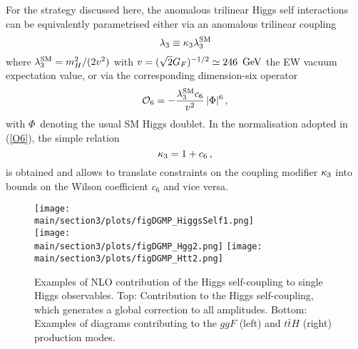 For the strategy discussed here, the anomalous trilinear Higgs self interactions can be equivalently parametrised either via an anomalous trilinear coupling  
\begin{equation}
\lambda_{3} \equiv \kappa_{3} \lambda_{3}^{\rm SM}
\end{equation}
where $\lambda_3^{\rm SM} = m_H^2/(2 v^2)$ with $v = (\sqrt{2} G_F)^{-1/2} \simeq 246 \, {\rm ~\text{GeV}}$ the EW vacuum expectation value, or via the corresponding dimension-six operator 
\begin{equation} \label{O6}
{\cal O}_6 = - \frac{\lambda_3^{\rm SM} c_6}{v^2} \, |\Phi|^6  \,,
\end{equation}
with $\Phi$~denoting the usual SM Higgs doublet. In the normalisation adopted in (\ref{O6}), the simple relation 
\begin{equation}
\kappa_{3} = 1 + c_6 \,,
\end{equation}
is obtained and allows to translate constraints on the coupling modifier $\kappa_{3}$ into bounds on the Wilson coefficient $c_6$ and vice versa. 

\begin{figure}
	\centering
	\texttt{[image: \\main/section3/plots/figDGMP\_HiggsSelf1.png]}\\
	\texttt{[image: \\main/section3/plots/figDGMP\_Hgg2.png]}
	\texttt{[image: \\main/section3/plots/figDGMP\_Htt2.png]}
	\caption{Examples of NLO contribution of the Higgs self-coupling to single Higgs observables. Top: Contribution to the Higgs self-coupling, which generates a global correction to all amplitudes. Bottom: Examples of diagrams contributing to the $ggF$ (left) and $t\bar{t}H$ (right) production modes.}
	\label{fig:singlehdiagrams}
\end{figure}

